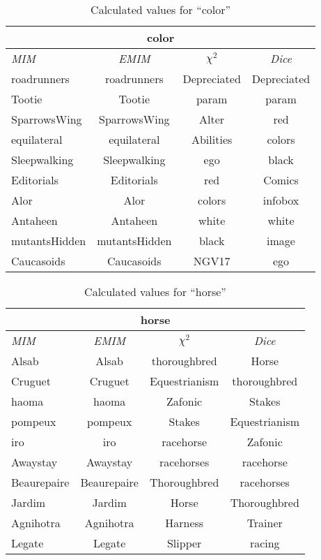 \begin{table}[h!]
\centering
\begin{tabular}{ l | c | c | c }
\hline
\multicolumn{4}{c}{color}\\
\hline
\textit{MIM} & \textit{EMIM} & \textit{\(\chi^2\)} & \textit{Dice}\\
\hline
roadrunners & roadrunners & Depreciated & Depreciated\\
Tootie & Tootie & param & param\\
SparrowsWing & SparrowsWing & Alter & red\\
equilateral & equilateral & Abilities & colors\\
Sleepwalking & Sleepwalking & ego & black\\
Editorials & Editorials & red & Comics\\
Alor & Alor & colors & infobox\\
Antaheen & Antaheen & white & white\\
mutantsHidden & mutantsHidden & black & image\\
Caucasoids & Caucasoids & NGV17 & ego\\
\hline
\end{tabular}
\caption{Calculated values for ``color''}
\label{tab:words}
\end{table}
\begin{table}[h!]
\centering
\begin{tabular}{ l | c | c | c }
\hline
\multicolumn{4}{c}{horse}\\
\hline
\textit{MIM} & \textit{EMIM} & \textit{\(\chi^2\)} & \textit{Dice}\\
\hline
Alsab & Alsab & thoroughbred & Horse\\
Cruguet & Cruguet & Equestrianism & thoroughbred\\
haoma & haoma & Zafonic & Stakes\\
pompeux & pompeux & Stakes & Equestrianism\\
iro & iro & racehorse & Zafonic\\
Awaystay & Awaystay & racehorses & racehorse\\
Beaurepaire & Beaurepaire & Thoroughbred & racehorses\\
Jardim & Jardim & Horse & Thoroughbred\\
Agnihotra & Agnihotra & Harness & Trainer\\
Legate & Legate & Slipper & racing\\
\hline
\end{tabular}
\caption{Calculated values for ``horse''}
\label{tab:words}
\end{table}

